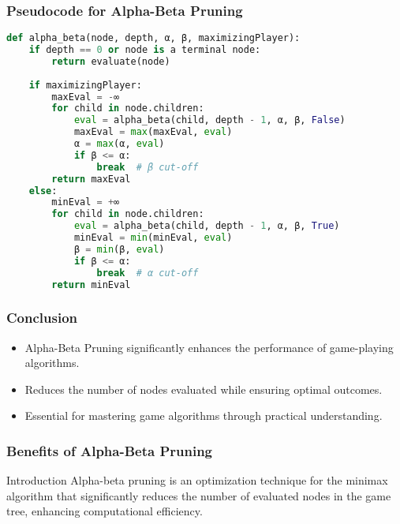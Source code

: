 \documentclass[aspectratio=169]{beamer}
\begin{document}
\begin{frame}[fragile]
    \frametitle{Pseudocode for Alpha-Beta Pruning}
    \begin{lstlisting}[language=Python]
def alpha_beta(node, depth, α, β, maximizingPlayer):
    if depth == 0 or node is a terminal node:
        return evaluate(node)
    
    if maximizingPlayer:
        maxEval = -∞
        for child in node.children:
            eval = alpha_beta(child, depth - 1, α, β, False)
            maxEval = max(maxEval, eval)
            α = max(α, eval)
            if β <= α:
                break  # β cut-off
        return maxEval
    else:
        minEval = +∞
        for child in node.children:
            eval = alpha_beta(child, depth - 1, α, β, True)
            minEval = min(minEval, eval)
            β = min(β, eval)
            if β <= α:
                break  # α cut-off
        return minEval
    \end{lstlisting}
\end{frame}

\begin{frame}
    \frametitle{Conclusion}
    \begin{itemize}
        \item Alpha-Beta Pruning significantly enhances the performance of game-playing algorithms.
        \item Reduces the number of nodes evaluated while ensuring optimal outcomes.
        \item Essential for mastering game algorithms through practical understanding.
    \end{itemize}
\end{frame}

\begin{frame}
    \frametitle{Benefits of Alpha-Beta Pruning}
    \begin{block}{Introduction}
        Alpha-beta pruning is an optimization technique for the minimax algorithm that significantly reduces the number of evaluated nodes in the game tree, enhancing computational efficiency.
    \end{block}
\end{frame}
\end{document}
